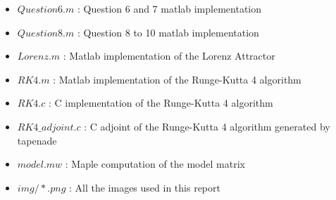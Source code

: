 \documentclass[11pt,a4paper]{article}
\begin{document}
\begin{itemize}
    \item $Question6.m$ : Question 6 and 7 matlab implementation
    \item $Question8.m$ : Question 8 to 10 matlab implementation
    \item $Lorenz.m$ : Matlab implementation of the Lorenz Attractor
    \item $RK4.m$    : Matlab implementation of the Runge-Kutta 4 algorithm
    \item $RK4.c$    : C implementation of the Runge-Kutta 4 algorithm
    \item $RK4\_adjoint.c$    : C adjoint of the Runge-Kutta 4 algorithm generated by tapenade
    \item $model.mw$ : Maple computation of the model matrix
    \item $img/*.png$ : All the images used in this report

\end{itemize}
\end{document}
